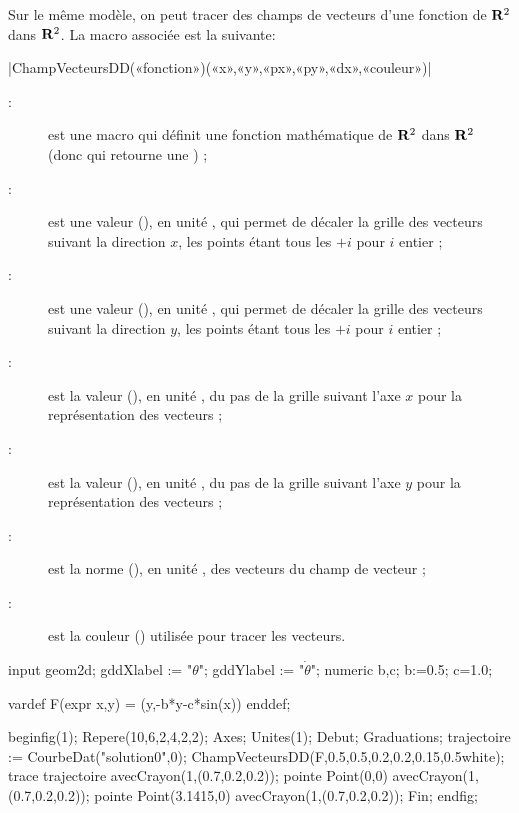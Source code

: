 \documentclass[a4paper,french]{article}
\begin{document}
Sur le même modèle, on peut tracer des champs de vecteurs d'une fonction de
$\mathbf{R}^2$ dans $\mathbf{R}^2$. 
La macro associée est la suivante:
\begin{colourband}
  \macro|ChampVecteursDD(«fonction»)(«x»,«y»,«px»,«py»,«dx»,«couleur»)|
  \begin{description}
    \item[:] est une macro \MP{} qui définit une fonction
    mathématique de $\mathbf{R}^2$ dans $\mathbf{R}^2$ (donc qui retourne une ) ;
    \item[:] est une valeur (), en unité , qui permet de décaler la
    grille des vecteurs suivant la direction $x$, les points étant tous les
    $+i$ pour $i$ entier ;
    \item[:] est une valeur (), en unité , qui permet de décaler la
    grille des vecteurs suivant la direction $y$, les points étant tous les
    $+i$ pour $i$ entier ;
    \item[:] est la valeur (), en unité
    , du pas de la grille suivant l'axe $x$ pour
    la représentation des vecteurs ;
    \item[:] est la valeur (), en unité
    , du pas de la grille suivant l'axe $y$ pour
    la représentation des vecteurs ;
    \item[:] est la norme (), en unité
    , des vecteurs du champ de vecteur ;
    \item[:] est la couleur () utilisée pour tracer
    les vecteurs.
  \end{description}
\end{colourband}

  \begin{ExempleMP}[sidebyside=false]
input geom2d;
gddXlabel := "$\theta$";
gddYlabel := "$\dot\theta$";
numeric b,c;
b:=0.5;
c=1.0;

vardef F(expr x,y) = (y,-b*y-c*sin(x)) enddef;

beginfig(1);
Repere(10,6,2,4,2,2);
Axes;
Unites(1);
Debut;
Graduations;
trajectoire := CourbeDat("solution0",0);
ChampVecteursDD(F,0.5,0.5,0.2,0.2,0.15,0.5white);
trace trajectoire  avecCrayon(1,(0.7,0.2,0.2));
pointe Point(0,0) avecCrayon(1,(0.7,0.2,0.2));
pointe Point(3.1415,0) avecCrayon(1,(0.7,0.2,0.2));
Fin;
endfig;
      \end{ExempleMP}
\end{document}
